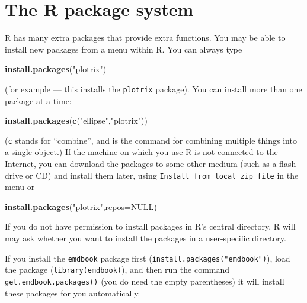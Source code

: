 \documentclass[11pt,]{article}
\newenvironment{Shaded}{\begin{snugshade}}{\end{snugshade}}
\newcommand{\KeywordTok}[1]{\textcolor[rgb]{0.13,0.29,0.53}{\textbf{#1}}}
\newcommand{\DataTypeTok}[1]{\textcolor[rgb]{0.13,0.29,0.53}{#1}}
\newcommand{\StringTok}[1]{\textcolor[rgb]{0.31,0.60,0.02}{#1}}
\newcommand{\OtherTok}[1]{\textcolor[rgb]{0.56,0.35,0.01}{#1}}
\newcommand{\NormalTok}[1]{#1}
\begin{document}
\section{The R package system}\label{the-r-package-system}

R has many extra packages that provide extra functions. You may be able
to install new packages from a menu within R. You can always type

\begin{Shaded}
\begin{Highlighting}[]
\KeywordTok{install.packages}\NormalTok{(}\StringTok{"plotrix"}\NormalTok{)}
\end{Highlighting}
\end{Shaded}

(for example --- this installs the \texttt{plotrix} package). You can
install more than one package at a time:

\begin{Shaded}
\begin{Highlighting}[]
\KeywordTok{install.packages}\NormalTok{(}\KeywordTok{c}\NormalTok{(}\StringTok{"ellipse"}\NormalTok{,}\StringTok{"plotrix"}\NormalTok{))}
\end{Highlighting}
\end{Shaded}

(\texttt{c} stands for ``combine'', and is the command for combining
multiple things into a single object.) If the machine on which you use R
is not connected to the Internet, you can download the packages to some
other medium (such as a flash drive or CD) and install them later, using
\texttt{Install\ from\ local\ zip\ file} in the menu or

\begin{Shaded}
\begin{Highlighting}[]
\KeywordTok{install.packages}\NormalTok{(}\StringTok{"plotrix"}\NormalTok{,}\DataTypeTok{repos=}\OtherTok{NULL}\NormalTok{)}
\end{Highlighting}
\end{Shaded}

If you do not have permission to install packages in R's central
directory, R will may ask whether you want to install the packages in a
user-specific directory.

If you install the \texttt{emdbook} package first
(\texttt{install.packages("emdbook")}), load the package
(\texttt{library(emdbook)}), and then run the command
\texttt{get.emdbook.packages()} (you do need the empty parentheses) it
will install these packages for you automatically.
\end{document}
